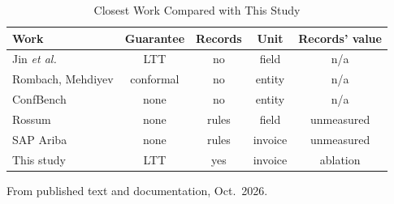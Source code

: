 \documentclass[conference]{IEEEtran}
\begin{document}
\begin{table}[t]
\caption{Closest Work Compared with This Study}
\begin{center}
\footnotesize
\setlength{\tabcolsep}{1.6pt}
\begin{tabular}{|l|c|c|c|c|}
\hline
\textbf{Work} & \textbf{Guarantee} & \textbf{Records} & \textbf{Unit} & \textbf{Records' value} \\
\hline
Jin \emph{et al.} \cite{jin2026plv} & LTT & no & field & n/a \\
Rombach, Mehdiyev \cite{rombach2026} & conformal & no & entity & n/a \\
ConfBench \cite{roy2026confbench} & none & no & entity & n/a \\
Rossum \cite{rossum2026rules,rossum2026mdh} & none & rules & field & unmeasured \\
SAP Ariba \cite{sapariba2026} & none & rules & invoice & unmeasured \\
This study & LTT & yes & invoice & ablation \\
\hline
\end{tabular}

\vspace{2pt}
\parbox{\columnwidth}{\footnotesize From published text and documentation, Oct.\ 2026.}
\label{tab:compare}
\end{center}
\end{table}

\end{document}
